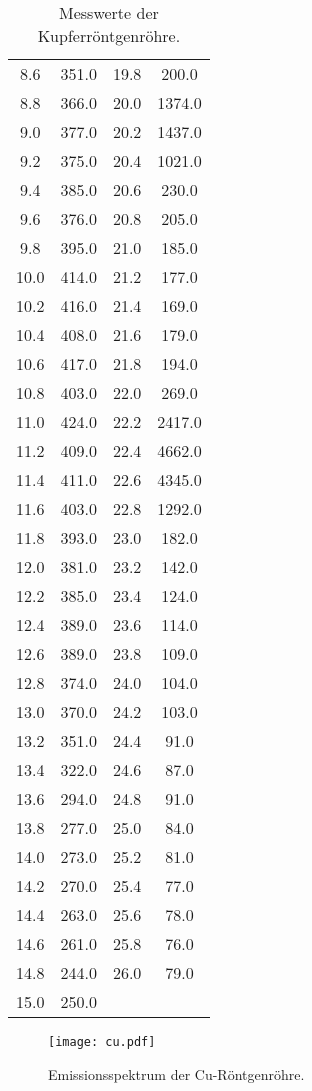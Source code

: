 \begin{table}
\begin{tabular}{c c | c c}
     8.6 & 351.0 & 19.8 &  200.0 \\
     8.8 & 366.0 & 20.0 & 1374.0 \\
     9.0 & 377.0 & 20.2 & 1437.0 \\
     9.2 & 375.0 & 20.4 & 1021.0 \\
     9.4 & 385.0 & 20.6 &  230.0 \\
     9.6 & 376.0 & 20.8 &  205.0 \\
     9.8 & 395.0 & 21.0 &  185.0 \\
    10.0 & 414.0 & 21.2 &  177.0 \\
    10.2 & 416.0 & 21.4 &  169.0 \\
    10.4 & 408.0 & 21.6 &  179.0 \\
    10.6 & 417.0 & 21.8 &  194.0 \\
    10.8 & 403.0 & 22.0 &  269.0 \\
    11.0 & 424.0 & 22.2 & 2417.0 \\
    11.2 & 409.0 & 22.4 & 4662.0 \\
    11.4 & 411.0 & 22.6 & 4345.0 \\
    11.6 & 403.0 & 22.8 & 1292.0 \\
    11.8 & 393.0 & 23.0 &  182.0 \\
    12.0 & 381.0 & 23.2 &  142.0 \\
    12.2 & 385.0 & 23.4 &  124.0 \\
    12.4 & 389.0 & 23.6 &  114.0 \\
    12.6 & 389.0 & 23.8 &  109.0 \\
    12.8 & 374.0 & 24.0 &  104.0 \\
    13.0 & 370.0 & 24.2 &  103.0 \\
    13.2 & 351.0 & 24.4 &   91.0 \\
    13.4 & 322.0 & 24.6 &   87.0 \\
    13.6 & 294.0 & 24.8 &   91.0 \\
    13.8 & 277.0 & 25.0 &   84.0 \\
    14.0 & 273.0 & 25.2 &   81.0 \\
    14.2 & 270.0 & 25.4 &   77.0 \\
    14.4 & 263.0 & 25.6 &   78.0 \\
    14.6 & 261.0 & 25.8 &   76.0 \\
    14.8 & 244.0 & 26.0 &   79.0 \\
    15.0 & 250.0 & & \\
    \bottomrule
  \end{tabular}
  \caption{Messwerte der Kupferröntgenröhre.}
\end{table}

\begin{figure}
  \centering
  \texttt{[image: cu.pdf]}
  \caption{Emissionsspektrum der Cu-Röntgenröhre.}
  \label{fig:cu}
\end{figure}
